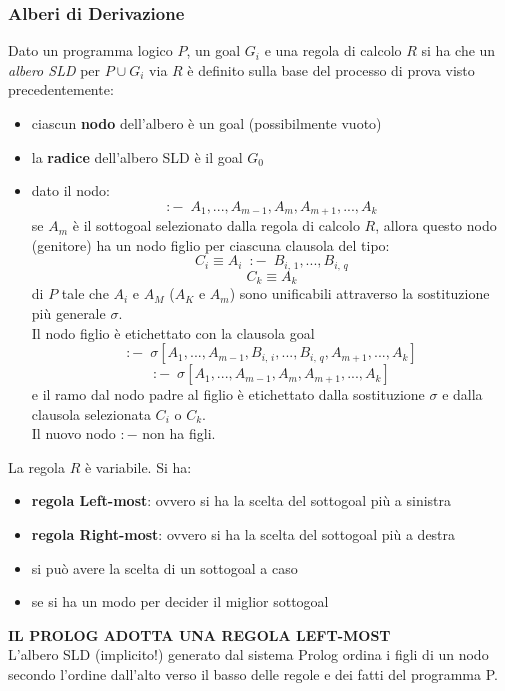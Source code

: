 \documentclass[a4paper,12pt, oneside]{book}
\begin{document}
\subsubsection{Alberi di Derivazione}
Dato un programma logico $P$, un goal $G_i$ e una regola di calcolo $R$ si ha che un \textit{albero SLD} per $P\cup G_i$ via $R$ è definito sulla base del processo di prova visto precedentemente:
\begin{itemize}
	\item ciascun \textbf{nodo} dell'albero è un goal (possibilmente vuoto)
	\item la \textbf{radice }dell'albero SLD è il goal $G_0$
	\item dato il nodo:
	      $$:-\,\,\, A_1,...,A_{m-1},A_m,A_{m+1},...,A_k$$
	      se $A_m$ è il sottogoal selezionato dalla regola di calcolo $R$, allora questo nodo (genitore) ha un nodo figlio per ciascuna clausola del tipo:
	      $$C_i\equiv A_i\,\,\, :-\,\,\, B_{i,\,1},...,B_{i,\,q}$$
	      $$C_k\equiv A_k$$
	      di $P$ tale che $A_i$ e $A_M$ ($A_K$ e $A_m$) sono unificabili attraverso la sostituzione più generale $\sigma$.\\
	      Il nodo figlio è etichettato con la clausola goal
	      $$:-\,\,\,\sigma[A_1,...,A_{m-1},B_{i,\,i},...,B_{i,\,q},A_{m+1},...,A_k]$$
	      $$:-\,\,\,\sigma[A_1,...,A_{m-1},A_m,A_{m+1},...,A_k]$$
	      e il ramo dal nodo padre al figlio è etichettato dalla sostituzione $\sigma$ e dalla clausola selezionata $C_i$ o $C_k$.\\
	      Il nuovo nodo $:-$ non ha figli.
\end{itemize}
La regola $R$ è variabile. Si ha:
\begin{itemize}
	\item \textbf{regola Left-most}: ovvero si ha la scelta del sottogoal più a sinistra
	\item \textbf{regola Right-most}: ovvero si ha la scelta del sottogoal più a destra
	\item si può avere la scelta di un sottogoal a caso
	\item se si ha un modo per decider il miglior sottogoal
\end{itemize}
\textbf{IL PROLOG ADOTTA UNA REGOLA LEFT-MOST}
\\
L'albero SLD (implicito!) generato dal sistema Prolog ordina i figli di un nodo secondo l'ordine dall'alto verso il basso delle regole e dei fatti del programma P.
\end{document}
